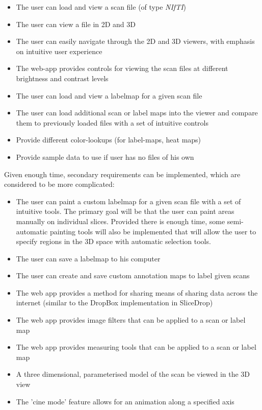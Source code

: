 \documentclass[a4paper,11pt,titlepage]{article}
\begin{document}
\begin{itemize}
\item The user can load and view a scan file (of type \textit{NIfTI})
\item The user can view a file in 2D and 3D
\item The user can easily navigate through the 2D and 3D viewers, with emphasis on intuitive user experience
\item The web-app provides controls for viewing the scan files at different brightness and contrast levels
\item The user can load and view a labelmap for a given scan file
\item The user can load additional scan or label maps into the viewer and compare them to previously loaded files with a set of intuitive controls
\item Provide different color-lookups (for label-maps, heat maps)
\item Provide sample data to use if user has no files of his own
\end{itemize}

Given enough time, secondary requirements can be implemented, which are considered to be more complicated:

\begin{itemize}
\item The user can paint a custom labelmap for a given scan file with a set of intuitive tools. The primary goal will be that the user can paint areas manually on individual slices. Provided there is enough time, some semi-automatic painting tools will also be implemented that will allow the user to specify regions in the 3D space with automatic selection tools. 
\item The user can save a labelmap to his computer
\item The user can create and save custom annotation maps to label given scans
\item The web app provides a method for sharing  means of sharing data across the internet (similar to the DropBox implementation in SliceDrop)
\item The web app provides image filters that can be applied to a scan or label map
\item The web app provides measuring tools that can be applied to a scan or label map
\item A three dimensional, parameterised model of the scan be viewed in the 3D view
\item The 'cine mode' feature allows for an animation along a specified axis
\end{itemize}
\end{document}
